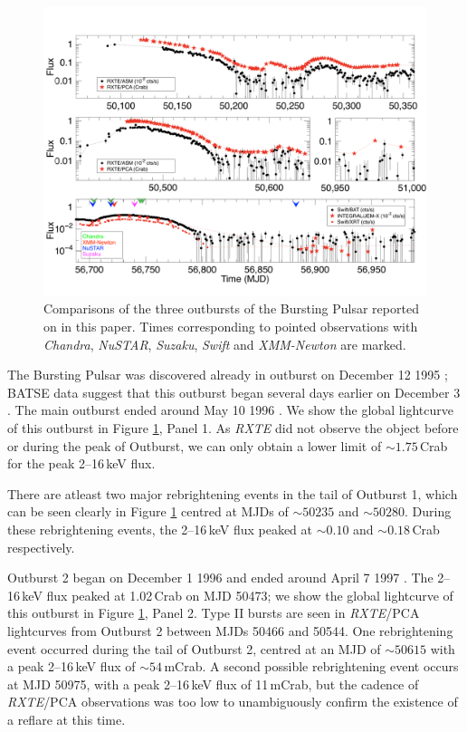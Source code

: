 \begin{figure}
  \centering
  \includegraphics[width=.9\linewidth, trim={0cm 0 0cm 0},clip]{images/lc_comp.pdf}
  \caption{\small Comparisons of the three outbursts of the Bursting Pulsar reported on in this paper.  Times corresponding to pointed observations with \textit{Chandra}, \textit{NuSTAR}, \textit{Suzaku}, \textit{Swift} and \textit{XMM-Newton} are marked.}
  \label{fig:global_ob}
\end{figure}

\par The Bursting Pulsar was discovered already in outburst on December 12 1995 \citep{Fishman_Discovery}; BATSE data suggest that this outburst began several days earlier on December 3 \citep{Paciesas_BPDiscovery,Bildsten_Rev}.  The main outburst ended around May 10 1996 \citep{Woods_PulseBursts}.  We show the global lightcurve of this outburst in Figure \ref{fig:global_ob}, Panel 1.  As \textit{RXTE} did not observe the object before or during the peak of Outburst, we can only obtain a lower limit of $\sim1.75$\,Crab for the peak 2--16\,keV flux.
\par There are atleast two major rebrightening events in the tail of Outburst 1, which can be seen clearly  in Figure \ref{fig:global_ob} centred at MJDs of $\sim50235$ and $\sim50280$.  During these rebrightening events, the 2--16\,keV flux peaked at $\sim0.10$ and $\sim0.18$\,Crab respectively.

\par Outburst 2 began on December 1 1996 and ended around April 7 1997 \citep{Woods_OB2}.  The 2--16\,keV flux peaked at 1.02\,Crab on MJD 50473; we show the global lightcurve of this outburst in Figure \ref{fig:global_ob}, Panel 2.  Type II bursts are seen in \textit{RXTE}/PCA lightcurves from Outburst 2 between MJDs 50466 and 50544.  One rebrightening event occurred during the tail of Outburst 2, centred at an MJD of $\sim50615$ with a peak 2--16\,keV flux of $\sim54$\,mCrab.  A second possible rebrightening event occurs at MJD 50975, with a peak 2--16\,keV flux of 11\,mCrab, but the cadence of \textit{RXTE}/PCA observations was too low to unambiguously confirm the existence of a reflare at this time.

